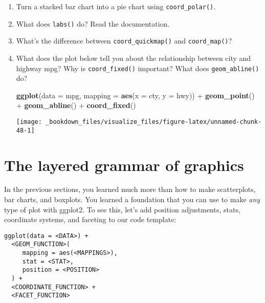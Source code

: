 \documentclass[]{book}
\newenvironment{Shaded}{\begin{snugshade}}{\end{snugshade}}
\newcommand{\KeywordTok}[1]{\textcolor[rgb]{0.13,0.29,0.53}{\textbf{{#1}}}}
\newcommand{\DataTypeTok}[1]{\textcolor[rgb]{0.13,0.29,0.53}{{#1}}}
\newcommand{\StringTok}[1]{\textcolor[rgb]{0.31,0.60,0.02}{{#1}}}
\newcommand{\NormalTok}[1]{{#1}}
\begin{document}
\begin{enumerate}
\def\labelenumi{\arabic{enumi}.}
\item
  Turn a stacked bar chart into a pie chart using
  \texttt{coord\_polar()}.
\item
  What does \texttt{labs()} do? Read the documentation.
\item
  What's the difference between \texttt{coord\_quickmap()} and
  \texttt{coord\_map()}?
\item
  What does the plot below tell you about the relationship between city
  and highway mpg? Why is \texttt{coord\_fixed()} important? What does
  \texttt{geom\_abline()} do?

\begin{Shaded}
\begin{Highlighting}[]
\KeywordTok{ggplot}\NormalTok{(}\DataTypeTok{data =} \NormalTok{mpg, }\DataTypeTok{mapping =} \KeywordTok{aes}\NormalTok{(}\DataTypeTok{x =} \NormalTok{cty, }\DataTypeTok{y =} \NormalTok{hwy)) +}
\StringTok{  }\KeywordTok{geom_point}\NormalTok{() +}\StringTok{ }
\StringTok{  }\KeywordTok{geom_abline}\NormalTok{() +}
\StringTok{  }\KeywordTok{coord_fixed}\NormalTok{()}
\end{Highlighting}
\end{Shaded}

  \begin{center}\texttt{[image: \_bookdown\_files/visualize\_files/figure-latex/unnamed-chunk-48-1]} \end{center}
\end{enumerate}

\section{The layered grammar of
graphics}\label{the-layered-grammar-of-graphics}

In the previous sections, you learned much more than how to make
scatterplots, bar charts, and boxplots. You learned a foundation that
you can use to make \emph{any} type of plot with ggplot2. To see this,
let's add position adjustments, stats, coordinate systems, and faceting
to our code template:

\begin{verbatim}
ggplot(data = <DATA>) + 
  <GEOM_FUNCTION>(
     mapping = aes(<MAPPINGS>),
     stat = <STAT>, 
     position = <POSITION>
  ) +
  <COORDINATE_FUNCTION> +
  <FACET_FUNCTION>
\end{verbatim}
\end{document}
